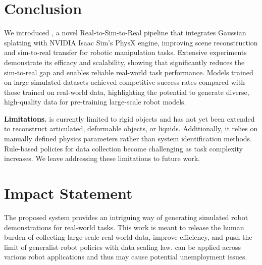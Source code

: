 \section{Conclusion}
\label{sec:conclusion}

We introduced \our, a novel Real-to-Sim-to-Real pipeline that integrates Gaussian splatting with NVIDIA Isaac Sim's PhysX engine, improving scene reconstruction and sim-to-real transfer for robotic manipulation tasks. Extensive experiments demonstrate its efficacy and scalability, showing that \our significantly reduces the sim-to-real gap and enables reliable real-world task performance. Models trained on large simulated datasets achieved competitive success rates compared with those trained on real-world data, highlighting the potential \our to generate diverse, high-quality data for pre-training large-scale robot models.


\noindent\textbf{Limitations.} 
 \our is currently limited to rigid objects and has not yet been extended to reconstruct articulated, deformable objects, or liquids. Additionally, it relies on manually defined physics parameters rather than system identification methods. Rule-based policies for data collection become challenging as task complexity increases. We leave addressing these limitations to future work. 



\section*{Impact Statement}

The proposed \our system provides an intriguing way of generating simulated robot demonstrations for real-world tasks. This work is meant to release the human burden of collecting large-scale real-world data, improve efficiency, and push the limit of generalist robot policies with data scaling law. \our can be applied across various robot applications and thus may cause potential unemployment issues.